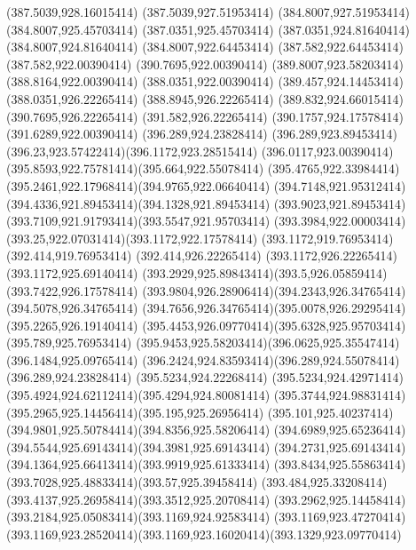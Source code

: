 {{	\lineto(387.5039,928.16015414)
	\lineto(387.5039,927.51953414)
	\lineto(384.8007,927.51953414)
	\lineto(384.8007,925.45703414)
	\lineto(387.0351,925.45703414)
	\lineto(387.0351,924.81640414)
	\lineto(384.8007,924.81640414)
	\lineto(384.8007,922.64453414)
	\lineto(387.582,922.64453414)
	\lineto(387.582,922.00390414)
	\closepath
	\moveto(390.7695,922.00390414)
	\lineto(389.8007,923.58203414)
	\lineto(388.8164,922.00390414)
	\lineto(388.0351,922.00390414)
	\lineto(389.457,924.14453414)
	\lineto(388.0351,926.22265414)
	\lineto(388.8945,926.22265414)
	\lineto(389.832,924.66015414)
	\lineto(390.7695,926.22265414)
	\lineto(391.582,926.22265414)
	\lineto(390.1757,924.17578414)
	\lineto(391.6289,922.00390414)
	\closepath
	\moveto(396.289,924.23828414)
	\curveto(396.289,923.89453414)(396.23,923.57422414)(396.1172,923.28515414)
	\curveto(396.0117,923.00390414)(395.8593,922.75781414)(395.664,922.55078414)
	\curveto(395.4765,922.33984414)(395.2461,922.17968414)(394.9765,922.06640414)
	\curveto(394.7148,921.95312414)(394.4336,921.89453414)(394.1328,921.89453414)
	\curveto(393.9023,921.89453414)(393.7109,921.91793414)(393.5547,921.95703414)
	\curveto(393.3984,922.00003414)(393.25,922.07031414)(393.1172,922.17578414)
	\lineto(393.1172,919.76953414)
	\lineto(392.414,919.76953414)
	\lineto(392.414,926.22265414)
	\lineto(393.1172,926.22265414)
	\lineto(393.1172,925.69140414)
	\curveto(393.2929,925.89843414)(393.5,926.05859414)(393.7422,926.17578414)
	\curveto(393.9804,926.28906414)(394.2343,926.34765414)(394.5078,926.34765414)
	\curveto(394.7656,926.34765414)(395.0078,926.29295414)(395.2265,926.19140414)
	\curveto(395.4453,926.09770414)(395.6328,925.95703414)(395.789,925.76953414)
	\curveto(395.9453,925.58203414)(396.0625,925.35547414)(396.1484,925.09765414)
	\curveto(396.2424,924.83593414)(396.289,924.55078414)(396.289,924.23828414)
	\closepath
	\moveto(395.5234,924.22268414)
	\curveto(395.5234,924.42971414)(395.4924,924.62112414)(395.4294,924.80081414)
	\curveto(395.3744,924.98831414)(395.2965,925.14456414)(395.195,925.26956414)
	\curveto(395.101,925.40237414)(394.9801,925.50784414)(394.8356,925.58206414)
	\curveto(394.6989,925.65236414)(394.5544,925.69143414)(394.3981,925.69143414)
	\curveto(394.2731,925.69143414)(394.1364,925.66413414)(393.9919,925.61333414)
	\curveto(393.8434,925.55863414)(393.7028,925.48833414)(393.57,925.39458414)
	\curveto(393.484,925.33208414)(393.4137,925.26958414)(393.3512,925.20708414)
	\curveto(393.2962,925.14458414)(393.2184,925.05083414)(393.1169,924.92583414)
	\lineto(393.1169,923.47270414)
	\curveto(393.1169,923.28520414)(393.1169,923.16020414)(393.1329,923.09770414)
}}

